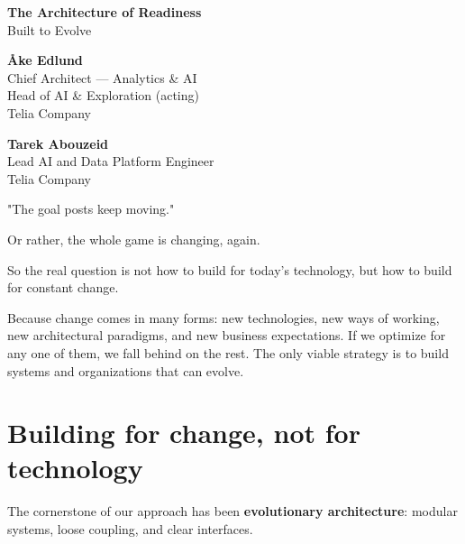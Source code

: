 \documentclass[11pt]{article}
\begin{document}
\pagestyle{plain}

\begin{center}

{\fontsize{24}{28}\selectfont \textbf{The Architecture of Readiness}}\\
\vspace{0.3em}
{\fontsize{16}{20}\selectfont Built to Evolve}

\vspace{2em}

\begin{minipage}[t]{0.45\textwidth}
\centering
\textbf{Åke Edlund} \\
{\small Chief Architect — Analytics \& AI} \\
{\small Head of AI \& Exploration (acting)} \\
{\small Telia Company}
\end{minipage}
\hfill
\begin{minipage}[t]{0.45\textwidth}
\centering
\textbf{Tarek Abouzeid} \\
{\small Lead AI and Data Platform Engineer} \\
{\small Telia Company}
\end{minipage}

\vspace{2em}

\end{center}

\vspace{2em}

"The goal posts keep moving."

Or rather, the whole game is changing, again.

So the real question is not how to build for today’s technology, but how to build for constant change.

Because change comes in many forms: new technologies, new ways of working, new architectural paradigms, and new business expectations. If we optimize for any one of them, we fall behind on the rest. The only viable strategy is to build systems and organizations that can evolve.

\section*{Building for change, not for technology}

The cornerstone of our approach has been \textbf{evolutionary architecture}: modular systems, loose coupling, and clear interfaces.
\end{document}
